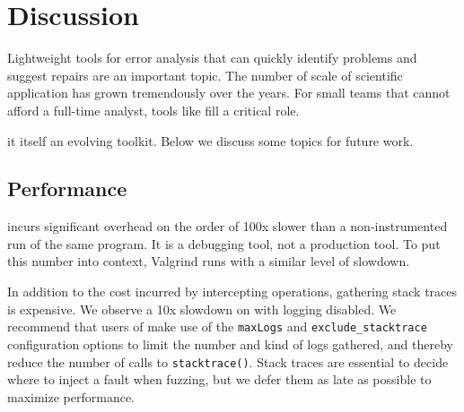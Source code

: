 \documentclass{juliacon}
\begin{document}



\section{Discussion}
\label{s:discussion}

Lightweight tools for error analysis that can quickly identify
\fp{} problems and suggest repairs are an important topic.
The number of scale of scientific application has grown tremendously
over the years.
For small teams that cannot afford a full-time
analyst, tools like \FlowFPX{} fill a critical role.

\FlowFPX{} it itself an evolving toolkit.
Below we discuss some topics for future work.


\subsection{Performance}
\label{s:discussion-performance}

\TF{} incurs significant overhead on the order of 100x slower than a non-instrumented run of the same program.
It is a debugging tool, not a production tool.
To put this number into context, Valgrind runs with a similar level of slowdown.

In addition to the cost incurred by intercepting \fp{} operations, gathering stack traces is expensive.
We observe a 10x slowdown on \ShallowWaters{} with logging disabled.
We recommend that users of \TF{} make use of the \texttt{maxLogs} and \texttt{exclude\_stacktrace} configuration options to limit the number and kind of logs gathered, and thereby reduce the number of calls to \texttt{stacktrace()}.
Stack traces are essential to decide where to inject a fault when fuzzing,
but we defer them as late as possible to maximize performance.
\end{document}
